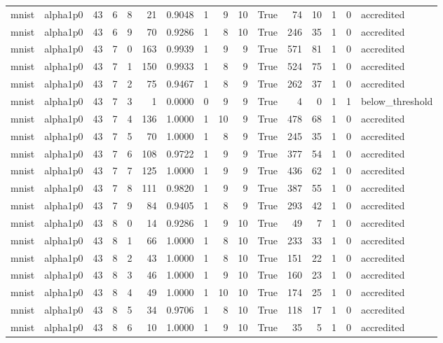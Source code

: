 \begin{tabular}{llrrrrrrrrrrrrrl}
mnist & alpha1p0 & 43 & 6 & 8 & 21 & 0.9048 & 1 & 9 & 10 & True & 74 & 10 & 1 & 0 & accredited \\
mnist & alpha1p0 & 43 & 6 & 9 & 70 & 0.9286 & 1 & 8 & 10 & True & 246 & 35 & 1 & 0 & accredited \\
mnist & alpha1p0 & 43 & 7 & 0 & 163 & 0.9939 & 1 & 9 & 9 & True & 571 & 81 & 1 & 0 & accredited \\
mnist & alpha1p0 & 43 & 7 & 1 & 150 & 0.9933 & 1 & 8 & 9 & True & 524 & 75 & 1 & 0 & accredited \\
mnist & alpha1p0 & 43 & 7 & 2 & 75 & 0.9467 & 1 & 8 & 9 & True & 262 & 37 & 1 & 0 & accredited \\
mnist & alpha1p0 & 43 & 7 & 3 & 1 & 0.0000 & 0 & 9 & 9 & True & 4 & 0 & 1 & 1 & below\_threshold \\
mnist & alpha1p0 & 43 & 7 & 4 & 136 & 1.0000 & 1 & 10 & 9 & True & 478 & 68 & 1 & 0 & accredited \\
mnist & alpha1p0 & 43 & 7 & 5 & 70 & 1.0000 & 1 & 8 & 9 & True & 245 & 35 & 1 & 0 & accredited \\
mnist & alpha1p0 & 43 & 7 & 6 & 108 & 0.9722 & 1 & 9 & 9 & True & 377 & 54 & 1 & 0 & accredited \\
mnist & alpha1p0 & 43 & 7 & 7 & 125 & 1.0000 & 1 & 9 & 9 & True & 436 & 62 & 1 & 0 & accredited \\
mnist & alpha1p0 & 43 & 7 & 8 & 111 & 0.9820 & 1 & 9 & 9 & True & 387 & 55 & 1 & 0 & accredited \\
mnist & alpha1p0 & 43 & 7 & 9 & 84 & 0.9405 & 1 & 8 & 9 & True & 293 & 42 & 1 & 0 & accredited \\
mnist & alpha1p0 & 43 & 8 & 0 & 14 & 0.9286 & 1 & 9 & 10 & True & 49 & 7 & 1 & 0 & accredited \\
mnist & alpha1p0 & 43 & 8 & 1 & 66 & 1.0000 & 1 & 8 & 10 & True & 233 & 33 & 1 & 0 & accredited \\
mnist & alpha1p0 & 43 & 8 & 2 & 43 & 1.0000 & 1 & 8 & 10 & True & 151 & 22 & 1 & 0 & accredited \\
mnist & alpha1p0 & 43 & 8 & 3 & 46 & 1.0000 & 1 & 9 & 10 & True & 160 & 23 & 1 & 0 & accredited \\
mnist & alpha1p0 & 43 & 8 & 4 & 49 & 1.0000 & 1 & 10 & 10 & True & 174 & 25 & 1 & 0 & accredited \\
mnist & alpha1p0 & 43 & 8 & 5 & 34 & 0.9706 & 1 & 8 & 10 & True & 118 & 17 & 1 & 0 & accredited \\
mnist & alpha1p0 & 43 & 8 & 6 & 10 & 1.0000 & 1 & 9 & 10 & True & 35 & 5 & 1 & 0 & accredited \\

\end{tabular}
